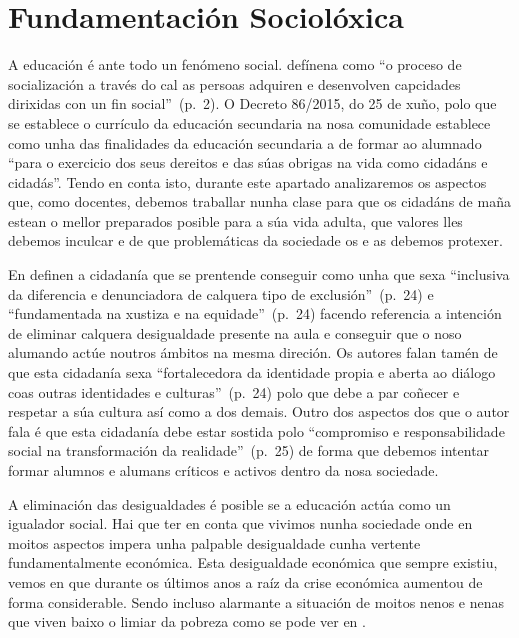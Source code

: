 
\section{Fundamentación Sociolóxica}

A educación é ante todo un fenómeno social.  defínena como ``o proceso de socialización a través do cal as persoas adquiren e desenvolven capcidades dirixidas con un fin social''~(p.~2). O Decreto 86/2015, do 25 de xuño, polo que se establece o currículo da educación secundaria na nosa comunidade establece como unha das finalidades da educación secundaria a de formar ao alumnado ``para o exercicio dos seus dereitos e das súas obrigas na vida como cidadáns e cidadás''. Tendo en conta isto, durante este apartado analizaremos os aspectos que, como docentes, debemos traballar nunha clase para que os cidadáns de maña estean o mellor preparados posible para a súa vida adulta, que valores lles debemos inculcar e de que problemáticas da sociedade os e as debemos protexer.

En  definen a cidadanía que se prentende conseguir como unha que sexa ``inclusiva da diferencia e denunciadora de calquera tipo de exclusión''~(p.~24) e ``fundamentada na xustiza e na equidade''~(p.~24) facendo referencia a intención de eliminar calquera desigualdade presente na aula e conseguir que o noso alumando actúe noutros ámbitos na mesma direción. Os autores falan tamén de que esta cidadanía sexa ``fortalecedora da identidade propia e aberta ao diálogo coas outras identidades e culturas''~(p.~24) polo que debe a par coñecer e respetar a súa cultura así como a dos demais. Outro dos aspectos dos que o autor fala é que esta cidadanía debe estar sostida polo ``compromiso e responsabilidade social na transformación da realidade''~(p.~25) de forma que debemos intentar formar alumnos e alumans críticos e activos dentro da nosa sociedade.

A eliminación das desigualdades é posible se a educación actúa como un igualador social. Hai que ter en conta que vivimos nunha sociedade onde en moitos aspectos impera unha palpable desigualdade cunha vertente fundamentalmente económica. Esta desigualdade económica que sempre existiu, vemos en  que durante os últimos anos a raíz da crise económica aumentou de forma considerable. Sendo incluso alarmante a situación de moitos nenos e nenas que viven baixo o limiar da pobreza como se pode ver en .

